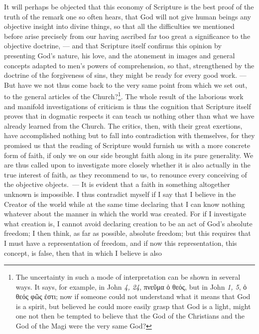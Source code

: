 \documentclass[12pt]{book}
\newcommand{\opage}[1]{\marginnote{\footnotesize\textit{[#1]}}}
\begin{document}
It will perhaps be objected that this economy of Scripture is the best proof of
the truth of the remark one so often hears, that God will not give human
beings any objective
\opage{113}\setcounter{footnote}{0}%
insight into divine things, so that all the difficulties we mentioned before
arise precisely from our having ascribed far too great a significance to the
objective doctrine, --- and that Scripture itself confirms this opinion by
presenting God's nature, his love, and the atonement in images and general
concepts adapted to men's powers of comprehension, so that, strengthened by
the doctrine of the forgiveness of sins, they might be ready for every good
work. --- But have we not thus come back to the very same point from which we
set out, to the general articles of the Church?\footnote{The uncertainty in
such a mode of interpretation can be shown in several ways. It says, for
example, in John \textit{4, 24}, πνεῦμα ὁ θεός, but in John \textit{1, 5}, ὁ
θεός φῶς ἐστι; now if someone could not understand what it means that God is a
spirit, but believed he could more easily grasp that God is a light, might one
not then be tempted to believe that the God of the Christians and the God of
the Magi were the very same God?}. The whole result of the laborious work and
manifold investigations of criticism is thus the cognition that Scripture
itself proves that in dogmatic respects it can teach us nothing other than
what we have already learned from the Church. The critics, then, with their
great exertions, have accomplished nothing but to fall into contradiction with
themselves, for they promised us that the reading of Scripture would furnish
us with a more concrete form of faith, if only we on our side brought faith
along in its pure generality. We are thus called upon to investigate more
closely whether it is also actually in the true interest of faith, as they
recommend to us, to renounce every conceiving of the objective
objects.~--- It is evident that a faith in something altogether unknown is
impossible. I thus contradict myself if I say that I believe in the Creator of
the world while at the same time declaring that I can know nothing whatever
about the manner in which the world was created. For if I investigate what
\opage{114} \setcounter{footnote}{0}%
creation is, I cannot avoid declaring creation to be an act of God's absolute
freedom; I then think, as far as possible, absolute freedom; but this
requires that I must have a representation of freedom, and if now this
representation, this concept, is false, then that in which I believe is also
\end{document}
